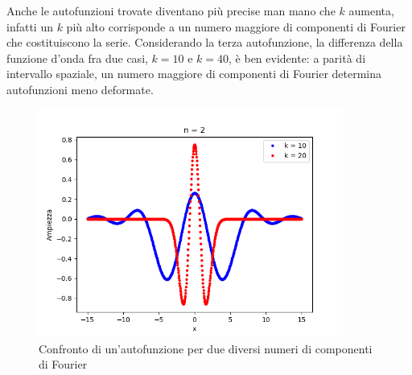 \documentclass[a4paper,11pt]{article}
\begin{document}
Anche le autofunzioni trovate diventano più precise man mano che $k$ aumenta, infatti un $k$ più alto corrisponde a un numero maggiore di componenti di Fourier che costituiscono la serie. Considerando la terza autofunzione, la differenza della funzione d'onda  fra due casi, $k = 10$ e $k = 40$, è ben evidente: a parità di intervallo spaziale, un numero maggiore di componenti di Fourier determina autofunzioni meno deformate.

\begin{figure}
\centering
\includegraphics[width=10cm]{fourier.png}
\caption{Confronto di un'autofunzione per due diversi numeri di componenti di Fourier}
\end{figure}
\end{document}
